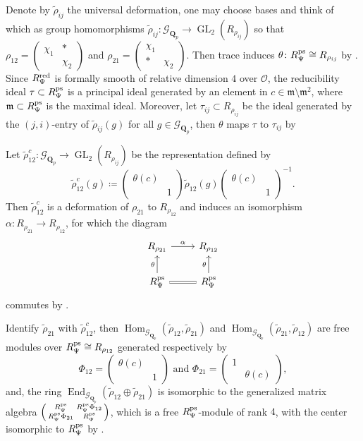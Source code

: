 \documentclass[leqno]{amsart}
\newcommand{\smat}[1]{\left( \begin{smallmatrix} #1 \end{smallmatrix} \right)}
\newcommand{\Gp}{\mathcal{G}_{\Qp}} %
\newcommand{\ps}{\textnormal{ps}}
\newcommand{\red}{\textnormal{red}}
\DeclareMathOperator{\GL}{GL}
\newcommand{\Qp}{\mathbf{Q}_p}
\newcommand{\oo}{\mathcal O}
\newcommand{\1}{\mathbf{1}}
\newcommand{\fm}{\mathfrak m}
\DeclareMathOperator{\End}{End}
\DeclareMathOperator{\Hom}{Hom}
\theoremstyle{definition}
\theoremstyle{remark}
\begin{document}
Denote by $\tilde{\rho}_{ij}$ the universal deformation,
one may choose bases and think of which as group homomorphisms
$\tilde{\rho}_{ij}\colon \Gp\to \GL_2(R_{\rho_{ij}})$
so that 
$\rho_{12}=\smat{\chi_1&*\\&\chi_2}$ and
$\rho_{21}=\smat{\chi_1&\\ * &\chi_2}$.
Then trace induces $\theta\colon R_{\Psi}^{\ps}\cong R_{\rho_{ij}}$ by \cite[Prop B.17]{pask}.
Since $R^{\red}_{\Psi}$ is formally smooth of relative dimension $4$ over $\oo$,
the reducibility ideal  $\tau\subset R_{\Psi}^{\ps}$ is a principal ideal generated by 
an element in $c\in\fm\setminus \fm^2$,
where $\fm\subset R_{\Psi}^{\ps}$ is the maximal ideal. 
Moreover, let $\tau_{ij}\subset R_{\rho_{ij}} $ be the ideal 
generated by the $(j,i)$-entry of  $ \tilde{\rho}_{ij}(g)$
for all $g\in \Gp$,
then  $\theta$ maps  $\tau$ to  $\tau_{ij}$ by \cite[Prop B.23]{pask}

Let $\tilde{\rho}_{12}^c\colon \Gp\to \GL_2(R_{\rho_{ij}})$ be the representation defined by
\begin{equation*}
	\tilde{\rho}_{12}^c(g)\coloneqq 
	\smat{\theta(c)&\\&1}
	\tilde{\rho}_{12}(g)
	\smat{\theta(c)&\\&1}^{-1}.
\end{equation*}
Then $ \tilde{\rho}_{12}^c$ is a deformation of $\rho_{21}$ to $R_{\rho_{12}}$
and induces an isomorphism $\alpha\colon R_{\rho_{21}}\to R_{\rho_{12}}$,
for which the diagram
\begin{equation*}
	\begin{tikzcd}
		R_{\rho_{21}} \arrow[r,"\alpha"] &
		R_{\rho_{12}}\\
		R_{\Psi}^{\ps} \arrow[u,"\theta"] \arrow[r,equal] &
		R_{\Psi}^{\ps} \arrow[u,"\theta"]
	\end{tikzcd}
\end{equation*}
commutes by \cite[Prop B.24]{pask}.

Identify $\tilde{\rho}_{21}$ with $\tilde{\rho}_{12}^c$,
then
$\Hom_{\Gp}(\tilde{\rho}_{12}, \tilde{\rho}_{21})$ and
$\Hom_{\Gp}(\tilde{\rho}_{21}, \tilde{\rho}_{12})$
are free modules over $R_{\Psi}^{\ps}\cong R_{\rho_{12}}$ 
generated respectively by
\begin{equation}\label{eq:Phi_ij}
	\Phi_{12}=\smat{\theta(c)&\\&1} \text{ and }
	\Phi_{21}=\smat{1&\\&\theta(c)},
\end{equation}
and, the ring $\End_{\Gp}(\tilde{\rho}_{12}\oplus \tilde{\rho}_{21})$
is isomorphic to the generalized matrix algebra
$\smat{R_{\Psi}^{\ps}& R_{\Psi}^{\ps}\Phi_{12}\\ R_{\Psi}^{\ps}\Phi_{21}& R_{\Psi}^{\ps}}$,
which is a free $R_{\Psi}^{\ps}$-module of rank  $4$,
with the center isomorphic to  $R_{\Psi}^{\ps}$
by \cite[Prop B.26]{pask}.
\end{document}
